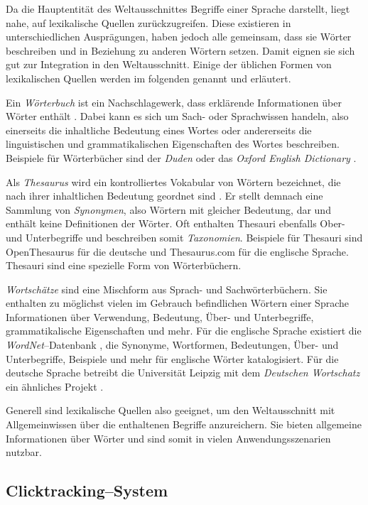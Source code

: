 Da die Hauptentität des Weltausschnittes Begriffe einer Sprache darstellt, liegt nahe, auf lexikalische Quellen zurückzugreifen. Diese existieren in unterschiedlichen Ausprägungen, haben jedoch alle gemeinsam, dass sie Wörter beschreiben und in Beziehung zu anderen Wörtern setzen. Damit eignen sie sich gut zur Integration in den Weltausschnitt. Einige der üblichen Formen von lexikalischen Quellen werden im folgenden genannt und erläutert.

Ein \emph{Wörterbuch} ist ein Nachschlagewerk, dass erklärende Informationen über Wörter enthält \cite{hk2003}. Dabei kann es sich um Sach- oder Sprachwissen handeln, also einerseits die inhaltliche Bedeutung eines Wortes oder andererseits die linguistischen und grammatikalischen Eigenschaften des Wortes beschreiben. Beispiele für Wörterbücher sind der \emph{Duden} \cite{duden} oder das \emph{Oxford English Dictionary} \cite{oed2010}.

Als \emph{Thesaurus} wird ein kontrolliertes Vokabular von Wörtern bezeichnet, die nach ihrer inhaltlichen Bedeutung geordnet sind \cite[S. 2]{ac2004}. Er stellt demnach eine Sammlung von \emph{Synonymen}, also Wörtern mit gleicher Bedeutung, dar und enthält keine Definitionen der Wörter. Oft enthalten Thesauri ebenfalls Ober- und Unterbegriffe und beschreiben somit \emph{Taxonomien}. Beispiele für Thesauri sind OpenThesaurus \cite{ot2013} für die deutsche und Thesaurus.com \cite{tc2013} für die englische Sprache. Thesauri sind eine spezielle Form von Wörterbüchern.

\emph{Wortschätze} sind eine Mischform aus Sprach- und Sachwörterbüchern. Sie enthalten zu möglichst vielen im Gebrauch befindlichen Wörtern einer Sprache Informationen über Verwendung, Bedeutung, Über- und Unterbegriffe, grammatikalische Eigenschaften und mehr.
Für die englische Sprache existiert die \emph{WordNet}--Datenbank \cite{wn2013, fc1998}, die Synonyme, Wortformen, Bedeutungen, Über- und Unterbegriffe, Beispiele und mehr für englische Wörter katalogisiert. Für die deutsche Sprache betreibt die Universität Leipzig mit dem \emph{Deutschen Wortschatz} ein ähnliches Projekt \cite{ws2013}.

Generell sind lexikalische Quellen also geeignet, um den Weltausschnitt mit Allgemeinwissen über die enthaltenen Begriffe anzureichern. Sie bieten allgemeine Informationen über Wörter und sind somit in vielen Anwendungsszenarien nutzbar.

\subsection{Clicktracking--System}
\label{clicktracking_theo}

